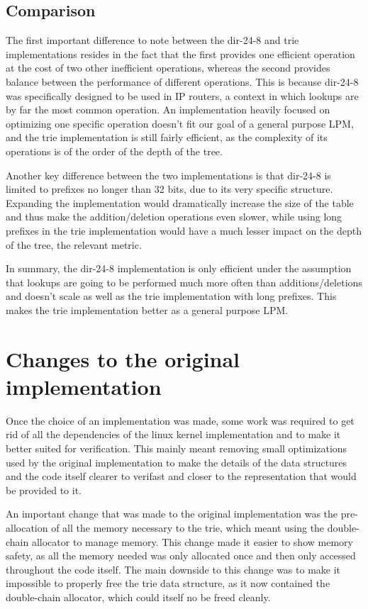 \documentclass{article}
\begin{document}
\subsection{Comparison}
The first important difference to note between the dir-24-8 and trie implementations
resides in the fact that the first provides one efficient operation at the cost of
two other inefficient operations, whereas the second provides balance between the
performance of different operations. This is because dir-24-8 was specifically
designed to be used in IP routers, a context in which lookups are by far the most
common operation. An implementation heavily focused on optimizing one specific
operation doesn't fit our goal of a general purpose LPM, and the trie implementation
is still fairly efficient, as the complexity of its operations is of the order of
the depth of the tree. \par
Another key difference between the two implementations is that dir-24-8 is limited
to prefixes no longer than 32 bits, due to its very specific structure. Expanding
the implementation would dramatically increase the size of the table and thus make
the addition/deletion operations even slower, while using long prefixes in the trie
implementation would have a much lesser impact on the depth of the tree, the relevant metric. \par
In summary, the dir-24-8 implementation is only efficient under the assumption that
lookups are going to be performed much more often than additions/deletions and doesn't
scale as well as the trie implementation with long prefixes. This makes the trie
implementation better as a general purpose LPM.
\section{Changes to the original implementation}
Once the choice of an implementation was made, some work was required to get rid of
all the dependencies of the linux kernel implementation and to make it better suited
for verification. This mainly meant removing small optimizations used by the original
implementation to make the details of the data structures and the code itself clearer
to verifast and closer to the representation that would be provided to it. \par
An important change that was made to the original implementation was the pre-allocation
of all the memory necessary to the trie, which meant using the double-chain allocator
to manage memory. This change made it easier to show memory safety, as all the
memory needed was only allocated once and then only accessed throughout the code
itself. The main downside to this change was to make it impossible to properly free
the trie data structure, as it now contained the double-chain allocator, which could
itself no be freed cleanly.
\end{document}
